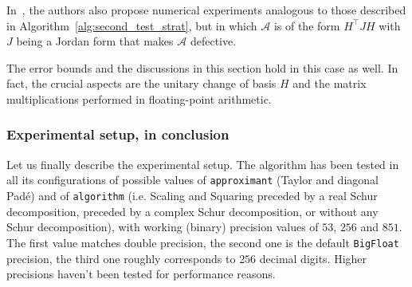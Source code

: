 \begin{oss*}
	In~\cite{exptayotf18}, the authors also propose numerical experiments analogous to those described in Algorithm~\ref{alg:second_test_strat}, but in which $\mathcal{A}$ is of the form $H^{\top}\!JH$ with $J$ being a Jordan form that makes $\mathcal{A}$ defective.
	
	The error bounds and the discussions in this section hold in this case as well. In fact, the crucial aspects are the unitary change of basis $H$ and the matrix multiplications performed in floating-point arithmetic. 
\end{oss*}

\subsubsection{Experimental setup, in conclusion}
Let us finally describe the experimental setup. The algorithm has been tested in all its configurations of possible values of \texttt{approximant} (Taylor and diagonal Padé) and of \texttt{algorithm} (i.e. Scaling and Squaring preceded by a real Schur decomposition, preceded by a complex Schur decomposition, or without any Schur decomposition), with working (binary) precision values of $53$, $256$ and $851$. The first value matches double precision, the second one is the default \texttt{BigFloat} precision, the third one roughly corresponds to $256$ decimal digits. Higher precisions haven't been tested for performance reasons. 


